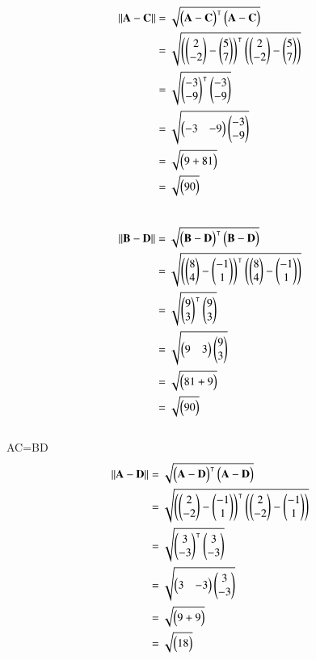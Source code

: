 \documentclass[journal,12pt,twocolumn]{IEEEtran}
\begin{document}
\begin{align}
\norm{\vec{A}-\vec{C}}&= \sqrt{\myvec{\vec{A}-\vec{C}}^\intercal\myvec{\vec{A}-\vec{C}}}\\
&=\sqrt{\myvec{\myvec{2\\-2}-\myvec{5\\7}}^\intercal\myvec{\myvec{2\\-2}-\myvec{5\\7}}}\\
&=\sqrt{\myvec{-3\\-9}^\intercal\myvec{-3\\-9}} \\
&=\sqrt{\myvec{-3 & -9}\myvec{-3\\-9}} \\
&=\sqrt{\myvec{9+81}}  \nonumber \\
&= \sqrt{\myvec{90}}\nonumber 
\end{align}
\\
\begin{align}
\norm{\vec{B}-\vec{D}}&= \sqrt{\myvec{\vec{B}-\vec{D}}^\intercal\myvec{\vec{B}-\vec{D}}}\\
&=\sqrt{\myvec{\myvec{8\\4}-\myvec{-1\\1}}^\intercal\myvec{\myvec{8\\4}-\myvec{-1\\1}}}\\
&=\sqrt{\myvec{9\\3}^\intercal\myvec{9\\3}} \\
&=\sqrt{\myvec{9 & 3}\myvec{9\\3}} \\
&=\sqrt{\myvec{81+9}}  \nonumber \\
&= \sqrt{\myvec{90}}\nonumber 
\end{align}
\\
AC=BD\\
\begin{align}
\norm{\vec{A}-\vec{D}}&= \sqrt{\myvec{\vec{A}-\vec{D}}^\intercal\myvec{\vec{A}-\vec{D}}}\\
&=\sqrt{\myvec{\myvec{2\\-2}-\myvec{-1\\1}}^\intercal\myvec{\myvec{2\\-2}-\myvec{-1\\1}}}\\
&=\sqrt{\myvec{3\\-3}^\intercal\myvec{3\\-3}} \\
&=\sqrt{\myvec{3 & -3}\myvec{3\\-3}} \\
&=\sqrt{\myvec{9+9}}  \nonumber \\
&= \sqrt{\myvec{18}}\nonumber 
\end{align}
\end{document}
